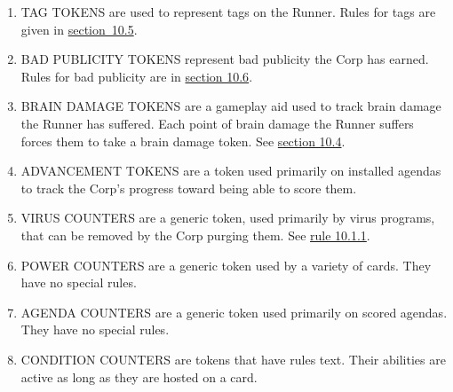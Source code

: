 \begin{enumerate}
\begin{enumerate}
		      \item  TAG TOKENS are used to represent tags on the Runner. Rules for tags are given in \hyperlink{page.i}{section~10.5}.
		      \item  BAD PUBLICITY TOKENS represent bad publicity the Corp has earned. Rules for bad publicity are in \hyperlink{page.i}{section 10.6}.
		      \item BRAIN DAMAGE TOKENS are a gameplay aid used to track brain damage the Runner has suffered. Each point of brain damage the Runner suffers forces them to take a brain damage token. See \hyperlink{page.i}{section 10.4}.
		      \item ADVANCEMENT TOKENS are a token used primarily on installed agendas to track the Corp's progress toward being able to score them.
		      \item VIRUS COUNTERS are a generic token, used primarily by virus programs, that can be removed by the Corp purging them. See \hyperlink{page.i}{rule 10.1.1}.
		      \item POWER COUNTERS are a generic token used by a variety of cards. They have no special rules.
		      \item AGENDA COUNTERS are a generic token used primarily on scored agendas. They  have no special rules.
		      \item CONDITION COUNTERS are tokens that have rules text. Their abilities are active as	long as they are hosted on a card.
	      \end{enumerate}
\end{enumerate}

